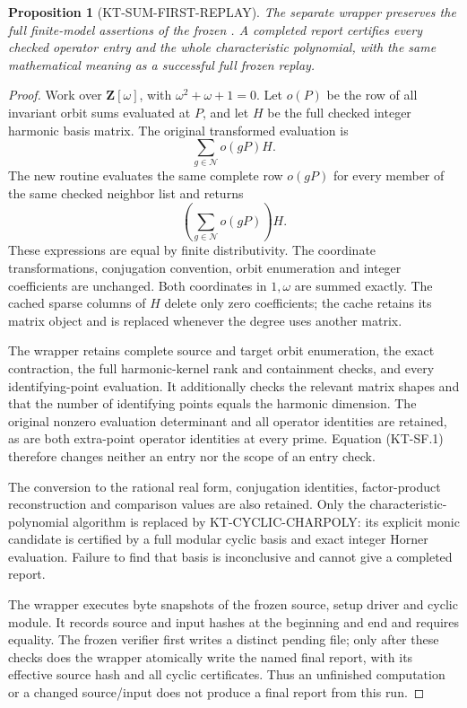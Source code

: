 \documentclass[11pt,a4paper]{article}
\newtheorem{proposition}[theorem]{Proposition}
\theoremstyle{definition}
\begin{document}
\begin{proposition}[KT-SUM-FIRST-REPLAY]
The separate wrapper 
preserves the full finite-model assertions of the frozen
.  A completed report
certifies every checked operator entry and the whole
characteristic polynomial, with the same mathematical
meaning as a successful full frozen replay.
\end{proposition}
\begin{proof}
Work over $\mathbf Z[\omega]$, with $\omega^2+\omega+1=0$.
Let $o(P)$ be the row of all invariant orbit sums evaluated
at $P$, and let $H$ be the full checked integer harmonic
basis matrix.  The original transformed evaluation is
\[
                    \sum_{g\in\mathcal N} o(gP)H.
\]
The new routine evaluates the same complete row $o(gP)$
for every member of the same checked neighbor list and
returns
\[
                    \left(\sum_{g\in\mathcal N}o(gP)\right)H.
                                                               \tag{KT-SF.1}
\]
These expressions are equal by finite distributivity.
The coordinate transformations, conjugation convention,
orbit enumeration and integer coefficients are unchanged.
Both coordinates in $1,\omega$ are summed exactly.  The
cached sparse columns of $H$ delete only zero coefficients;
the cache retains its matrix object and is replaced whenever
the degree uses another matrix.

The wrapper retains complete source and target orbit
enumeration, the exact contraction, the full harmonic-kernel
rank and containment checks, and every identifying-point
evaluation.  It additionally checks the relevant matrix
shapes and that the number of identifying points equals
the harmonic dimension.  The original nonzero evaluation
determinant and all operator identities are retained, as
are both extra-point operator identities at every prime.
Equation (KT-SF.1) therefore changes neither an entry nor
the scope of an entry check.

The conversion to the rational real form, conjugation
identities, factor-product reconstruction and comparison
values are also retained.  Only the characteristic-polynomial
algorithm is replaced by KT-CYCLIC-CHARPOLY: its explicit
monic candidate is certified by a full modular cyclic basis
and exact integer Horner evaluation.  Failure to find that
basis is inconclusive and cannot give a completed report.

The wrapper executes byte snapshots of the frozen source,
setup driver and cyclic module.  It records source and input
hashes at the beginning and end and requires equality.
The frozen verifier first writes a distinct pending file;
only after these checks does the wrapper atomically write
the named final report, with its effective source hash and
all cyclic certificates.  Thus an unfinished computation
or a changed source/input does not produce a final report
from this run.
\end{proof}
\end{document}
